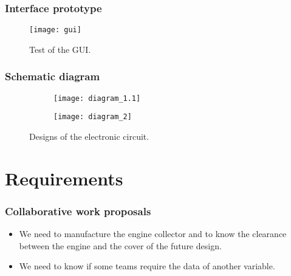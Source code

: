 \documentclass{beamer}
\begin{document}
	\begin{frame}
		\frametitle{Interface prototype}
		\begin{figure}
			\centering
			\texttt{[image: gui]}
			\caption{Test of the GUI.}
			\label{fig:gui}
		\end{figure}
	\end{frame}

	\begin{frame}
		\frametitle{Schematic diagram}
		\begin{figure}
			\centering
			\begin{subfigure}[b]{0.3\textwidth}
				\centering
				\texttt{[image: diagram\_1.1]}
			\end{subfigure}
			\hfill
			\begin{subfigure}[b]{0.69\textwidth}
				\centering
				\texttt{[image: diagram\_2]}
			\end{subfigure}
			\caption{Designs of the electronic circuit.}
			\label{fig:}
		\end{figure}
	
	\end{frame}

	\section{Requirements}
	\begin{frame}
	\frametitle{Collaborative work proposals}
	
	\begin{itemize}
		\item We need to manufacture the engine collector and to know the clearance between the engine and the cover of the future design.
		\item We need to know if some teams require the data of another variable.
		
	\end{itemize}

	\end{frame}

	
\end{document}
